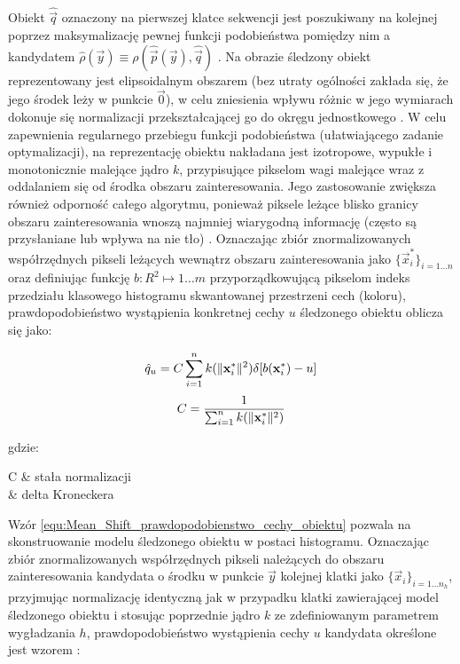 Obiekt $\hat{\vec{q}}$ oznaczony na pierwszej klatce sekwencji jest poszukiwany na kolejnej poprzez maksymalizację pewnej funkcji podobieństwa pomiędzy nim a kandydatem $\hat{\rho}(\vec{y}) \equiv \rho(\hat{\vec{p}}(\vec{y}), \hat{\vec{q}})$ \cite{Comaniciu2003}. Na obrazie śledzony obiekt reprezentowany jest elipsoidalnym obszarem (bez utraty ogólności zakłada się, że jego środek leży w punkcie $\vec{0}$), w celu zniesienia wpływu różnic w jego wymiarach dokonuje się normalizacji przekształcającej go do okręgu jednostkowego \cite{Comaniciu2003}.  W celu zapewnienia regularnego przebiegu funkcji podobieństwa (ułatwiającego zadanie optymalizacji), na reprezentację obiektu nakładana jest izotropowe, wypukłe i monotonicznie malejące jądro $k$, przypisujące pikselom wagi malejące wraz z oddalaniem się od środka obszaru zainteresowania. Jego zastosowanie zwiększa również odporność całego algorytmu, ponieważ piksele leżące blisko granicy obszaru zainteresowania wnoszą najmniej wiarygodną informację (często są przysłaniane lub wpływa na nie tło) \cite{Comaniciu2003}. Oznaczając zbiór znormalizowanych współrzędnych pikseli leżących wewnątrz obszaru zainteresowania jako $\{\vec{x}_i^*\}_{i=1 \dots n}$ oraz definiując funkcję $b : R^2 \mapsto {1 \dots m}$ przyporządkowującą pikselom indeks przedziału klasowego histogramu skwantowanej przestrzeni cech (koloru), prawdopodobieństwo wystąpienia konkretnej cechy $u$ śledzonego obiektu oblicza się jako:

\begin{equation}
\label{equ:Mean_Shift_prawdopodobienstwo_cechy_obiektu}
	\hat{q}_u = C \sum_{i=1}^n k (\lVert\mathbf{x}_i^*\rVert^2) \delta [ b(\mathbf{x}_i^*) - u]
\end{equation}
\begin{equation}
\label{equ:Mean_Shift_prawdopodobienstwo_cechy_obiektu_stala_normalizacji}
	C = \frac{1}{\sum_{i=1}^n k (\lVert\mathbf{x}_i^*\rVert^2) }
\end{equation}

\noindent
gdzie:

\begin{conditions}
	C & stała normalizacji \\
	\delta & delta Kroneckera \\
\end{conditions}

Wzór \ref{equ:Mean_Shift_prawdopodobienstwo_cechy_obiektu} pozwala na skonstruowanie modelu śledzonego obiektu w postaci histogramu. Oznaczając zbiór znormalizowanych współrzędnych pikseli należących do obszaru zainteresowania kandydata o środku w punkcie $\vec{y}$ kolejnej klatki jako $\{\vec{x}_i\}_{i=1 \dots n_h}$, przyjmując normalizację identyczną jak w przypadku klatki zawierającej model śledzonego obiektu i stosując poprzednie jądro $k$ ze zdefiniowanym parametrem wygładzania $h$, prawdopodobieństwo wystąpienia cechy $u$ kandydata określone jest wzorem \cite{Comaniciu2003}:

